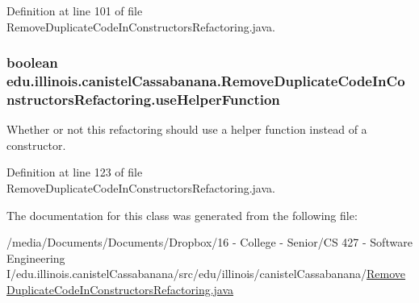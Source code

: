 Definition at line 101 of file RemoveDuplicateCodeInConstructorsRefactoring.java.

\hypertarget{classedu_1_1illinois_1_1canistelCassabanana_1_1RemoveDuplicateCodeInConstructorsRefactoring_ac3d10235e0a51b7d76e5a34233a842ae}{
\subsubsection[{useHelperFunction}]{\setlength{\rightskip}{0pt plus 5cm}boolean {\bf edu.illinois.canistelCassabanana.RemoveDuplicateCodeInConstructorsRefactoring.useHelperFunction}}}
\label{classedu_1_1illinois_1_1canistelCassabanana_1_1RemoveDuplicateCodeInConstructorsRefactoring_ac3d10235e0a51b7d76e5a34233a842ae}
Whether or not this refactoring should use a helper function instead of a constructor. 

Definition at line 123 of file RemoveDuplicateCodeInConstructorsRefactoring.java.



The documentation for this class was generated from the following file:\begin{DoxyCompactItemize}
\item 
/media/Documents/Documents/Dropbox/16 -\/ College -\/ Senior/CS 427 -\/ Software Engineering I/edu.illinois.canistelCassabanana/src/edu/illinois/canistelCassabanana/\hyperlink{RemoveDuplicateCodeInConstructorsRefactoring_8java}{RemoveDuplicateCodeInConstructorsRefactoring.java}\end{DoxyCompactItemize}
